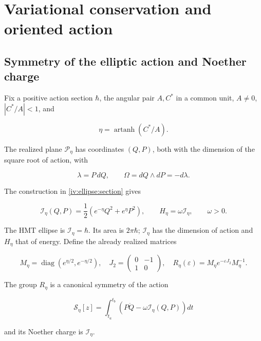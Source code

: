 \section{Variational conservation and oriented action}
\label{nuclear:7}
\subsection{Symmetry of the elliptic action and Noether charge}

Fix a positive action section \(\hbar\), the angular pair \(A,C^*\) in a common unit, \(A\ne0\), \(|C^*/A|<1\), and

\[
\eta=\operatorname{artanh}(C^*/A).
\]

The realized plane \(\mathcal P_\eta\) has coordinates \((Q,P)\), both with the dimension of the square root of action, with

\[
\lambda=P\,dQ,\qquad \Omega=dQ\wedge dP=-d\lambda.
\]

The construction in \cref{iv:ellipse:section} gives

\begin{equation}
\mathcal I_\eta(Q,P)=\frac12(e^{-\eta}Q^2+e^\eta P^2),
\qquad H_\eta=\omega\mathcal I_\eta,\qquad \omega>0.
\label{nuc07:eq:1}
\end{equation}

The HMT ellipse is \(\mathcal I_\eta=\hbar\). Its area is \(2\pi\hbar\); \(\mathcal I_\eta\) has the dimension of action and \(H_\eta\) that of energy. Define the already realized matrices

\begin{equation}
M_\eta=\operatorname{diag}(e^{\eta/2},e^{-\eta/2}),\quad
J_2=\begin{pmatrix}0&-1\\1&0\end{pmatrix},\quad
R_\eta(\varepsilon)=M_\eta e^{-\varepsilon J_2}M_\eta^{-1}.
\label{nuc07:eq:2}
\end{equation}

\begin{proposition}
The group \(R_\eta\) is a canonical symmetry of the action

\begin{equation}
\mathscr S_\eta[z]=\int_{t_a}^{t_b}
\left(P\dot Q-\omega\mathcal I_\eta(Q,P)\right)dt
\label{nuc07:eq:3}
\end{equation}

and its Noether charge is \(\mathcal I_\eta\).
\end{proposition}

